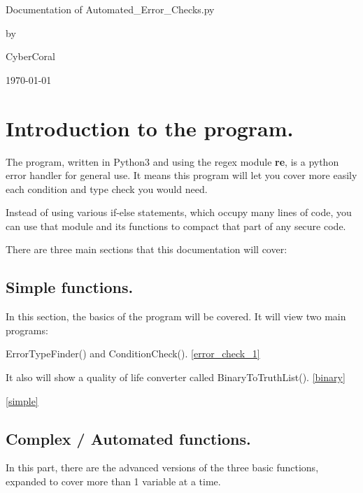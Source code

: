 \documentclass{article}
\begin{document}
	\begin{titlepage}
		\centering
		\vfill
		\vfill
		{\huge Documentation of Automated\_Error\_Checks.py}
		\vspace{3cm}
		
		by
		{\Large 
		CyberCoral
		\vspace{2cm}
		
		\today}
		\vfill

	\end{titlepage}
	\newpage
	\tableofcontents
	\newpage
	\section{Introduction to the program.}
	The program, written in Python3 and using the regex module \textbf{re}, is a python error handler for general use. It means this program will let you cover more easily each condition and type check you would need.
	
	Instead of using various if-else statements, which occupy many lines of code, you can use that module and its functions to compact that part of any secure code.
	
	
	
	There are three main sections that this documentation will cover:
	
	\subsection{Simple functions.} 
	In this section, the basics of the program will be covered. It will view two main programs: 
	
	ErrorTypeFinder() and ConditionCheck(). \ref{error_check_1}
	
	\hspace{-0.5cm}It also will show a quality of life converter called BinaryToTruthList(). \ref{binary}
	
	\ref{simple}
	
	\subsection{Complex / Automated functions.}
	In this part, there are the advanced versions of the three basic functions, expanded to cover more than 1 variable at a time. 
		
\end{document}
